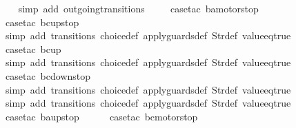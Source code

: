 \begin{isabellebody}
\ \ \isamarkupfalse%
\ {\isacharparenleft}simp\ add{\isacharcolon}\ outgoing{\isacharunderscore}transitions{\isacharunderscore}{}{\isacharparenright}\isanewline
\ \ \ \isamarkupfalse%
\ {\isacharparenleft}case{\isacharunderscore}tac\ {\isachardoublequoteopen}ba{\isacharequal}motorstop{}{\isachardoublequoteclose}{\isacharparenright}\isanewline
\ \ \ \ \isamarkupfalse%
\ {\isacharparenleft}case{\isacharunderscore}tac\ {\isachardoublequoteopen}bc{\isacharequal}up{}{}stop{\isachardoublequoteclose}{\isacharparenright}\isanewline
\ \ \ \ \ \isamarkupfalse%
\ {\isacharparenleft}simp\ add{\isacharcolon}\ transitions\ choice{\isacharunderscore}def\ apply{\isacharunderscore}guards{\isacharunderscore}def\ Str{\isacharunderscore}def\ value{\isacharunderscore}eq{\isacharunderscore}true{\isacharparenright}\isanewline
\ \ \ \ \isamarkupfalse%
\ {\isacharparenleft}case{\isacharunderscore}tac\ {\isachardoublequoteopen}bc{\isacharequal}up{}{}{\isachardoublequoteclose}{\isacharparenright}\isanewline
\ \ \ \ \ \isamarkupfalse%
\ {\isacharparenleft}simp\ add{\isacharcolon}\ transitions\ choice{\isacharunderscore}def\ apply{\isacharunderscore}guards{\isacharunderscore}def\ Str{\isacharunderscore}def\ value{\isacharunderscore}eq{\isacharunderscore}true{\isacharparenright}\isanewline
\ \ \ \ \isamarkupfalse%
\ {\isacharparenleft}case{\isacharunderscore}tac\ {\isachardoublequoteopen}bc{\isacharequal}down{}{}stop{\isachardoublequoteclose}{\isacharparenright}\isanewline
\ \ \ \ \ \isamarkupfalse%
\ {\isacharparenleft}simp\ add{\isacharcolon}\ transitions\ choice{\isacharunderscore}def\ apply{\isacharunderscore}guards{\isacharunderscore}def\ Str{\isacharunderscore}def\ value{\isacharunderscore}eq{\isacharunderscore}true{\isacharparenright}\isanewline
\ \ \ \ \isamarkupfalse%
\ {\isacharparenleft}simp\ add{\isacharcolon}\ transitions\ choice{\isacharunderscore}def\ apply{\isacharunderscore}guards{\isacharunderscore}def\ Str{\isacharunderscore}def\ value{\isacharunderscore}eq{\isacharunderscore}true{\isacharparenright}\isanewline
\ \ \ \isamarkupfalse%
\ {\isacharparenleft}case{\isacharunderscore}tac\ {\isachardoublequoteopen}ba{\isacharequal}up{}{}stop{\isachardoublequoteclose}{\isacharparenright}\isanewline
\ \ \ \ \isamarkupfalse%
\ {\isacharparenleft}case{\isacharunderscore}tac\ {\isachardoublequoteopen}bc{\isacharequal}motorstop{}{\isachardoublequoteclose}{\isacharparenright}\isanewline

\end{isabellebody}
